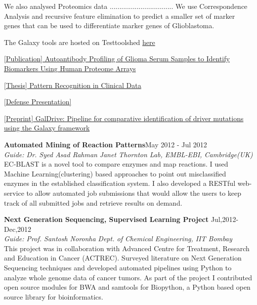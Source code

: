 \documentclass[margin,line]{res}
\begin{document}
\begin{resume}
We also analysed Proteomics data .................................
We use Correspondence Analysis and recursive feature elimination to predict a smaller set of marker genes that can be used to differentiate marker genes of Glioblastoma.

The Galaxy tools are hosted on Testtoolshed \href{https://testtoolshed.g2.bx.psu.edu/repository?user_id=5b9741dfa55cf19a}{here }

\href{http://www.ncbi.nlm.nih.gov/pmc/articles/PMC4570193/}{[Publication] Autoantibody Profiling of Glioma Serum Samples to Identify Biomarkers Using Human Proteome Arrays }

\href{http://figshare.com/articles/Pattern_Recognition_in_Clinical_Data/1089638 }{[Thesis] Pattern Recognition in Clinical Data}

\href{http://figshare.com/articles/Dual_Degree_Project_Presentation/1088457}{[Defense Presentation]}

\href{http://biorxiv.org/content/early/2014/10/19/010538}{[Preprint] GalDrive: Pipeline for comparative identification of driver mutations using the Galaxy framework}

\vspace{.3cm}
\textbf{Automated Mining of Reaction Patterns}\hfill {May 2012 - Jul 2012}\\
\textit{Guide: {Dr. Syed Asad Rahman}}
\hfill{\textit{{Janet Thornton Lab, EMBL-EBI, Cambridge(UK)}}}\\

\noindent
EC-BLAST is a novel tool to compare enzymes and map reactions.
I  used Machine Learning(clustering) based approaches to point out misclassified enzymes in the established classification system.
I also developed a RESTful web-service to allow automated job submissions that would allow the users to keep track of all submitted jobs and retrieve results on demand.

\vspace{.3cm}
\textbf{Next Generation Sequencing, Supervised Learning Project} \hfill {Jul,2012-Dec,2012}\\
\textit{Guide: {Prof. Santosh Noronha}} \hfill \textit{{Dept. of Chemical Engineering, IIT Bombay}}\\

This project  was  in collaboration with Advanced Centre for Treatment, Research and Education in Cancer (ACTREC).  
Surveyed literature on Next Generation Sequencing techniques and 
developed  automated pipelines using Python to analyze whole genome data of cancer tumors. As part of the project I contributed open source modules for BWA and samtools for Biopython, a Python based open source library for bioinformatics.


\end{resume}
\end{document}
